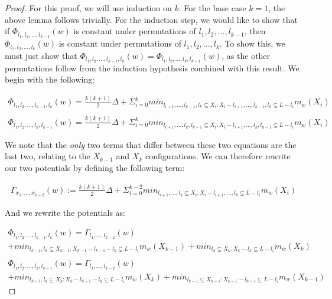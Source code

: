 \begin{proof}
    For this proof, we will use induction on $k$. For the base case $k=1$, the above lemma follows trivially. For the induction step, we would like to show that if $\Phi_{l_1, l_2, ..., l_{k-1}}(w)$ is constant under permutations of $l_1, l_2, ..., l_{k-1}$, then $\Phi_{l_1, l_2, ..., l_k}(w)$ is constant under permutations of $l_1, l_2, ..., l_k$. To show this, we must just show that $\Phi_{l_1, l_2, ..., l_{k-1}, l_k}(w) = \Phi_{l_1, l_2, ..., l_k, l_{k-1}}(w)$, as the other permutations follow from the induction hypothesis combined with this result. We begin with the following: 

    \begin{equation*}
        \begin{gathered}
            \Phi_{l_1, l_2, ..., l_{k-1}, l_k}(w) = \frac{k(k+1)}{2} \Delta + \Sigma_{i=0}^k min_{l_{i+1}, ..., l_{k-1}, l_k \subseteq X_i : X_i - l_{i+1}, ..., l_{k-1}, l_k \subseteq L - l_i} m_w(X_i) \\ \\
            \Phi_{l_1, l_2, ..., l_k, l_{k-1}}(w) = \frac{k(k+1)}{2} \Delta + \Sigma_{i=0}^k min_{l_{i+1}, ..., l_k, l_{k-1} \subseteq X_i : X_i - l_{i+1}, ..., l_k, l_{k-1} \subseteq L - l_i} m_w(X_i)
        \end{gathered}
    \end{equation*}

    We note that the \textit{only} two terms that differ between these two equations are the last two, relating to the $X_{k-1}$ and $X_k$ configurations. We can therefore rewrite our two potentials by defining the following term:
    
    \begin{equation*}
        \begin{gathered}
            \Gamma_{x_1, ..., x_{k-2}}(w) := \frac{k(k+1)}{2} \Delta + \Sigma_{i=0}^{k-2} min_{l_{i+1}, ..., l_k \subseteq X_i : X_i - l_{i+1}, ..., l_k \subseteq L - l_i} m_w(X_i)
        \end{gathered}
    \end{equation*}

    And we rewrite the potentials as: 

    \begin{equation*}
        \begin{gathered}
            \Phi_{l_1, l_2, ..., l_{k-1}, l_k}(w) = \Gamma_{l_1, ..., l_{k-2}}(w) \\
            + min_{l_{k-1}, l_k \subseteq X_{k-1} : X_{k-1} - l_{k-1} - l_k \subseteq L - l_i} m_w(X_{k-1}) +  min_{l_k \subseteq X_k : X_k - l_k \subseteq L - l_i} m_w(X_{k}) \\ \\
            \Phi_{l_1, l_2, ..., l_{k}, l_{k-1}}(w) = \Gamma_{l_1, ..., l_{k-2}}(w) \\
            + min_{l_{k-1}, l_k \subseteq X_{k} : X_{k} - l_{k-1} - l_k \subseteq L - l_i} m_w(X_{k}) +  min_{l_{k-1} \subseteq X_{k-1} : X_{k-1} - l_{k-1} \subseteq L - l_i} m_w(X_{k-1})
        \end{gathered}
    \end{equation*}
    

\end{proof}
